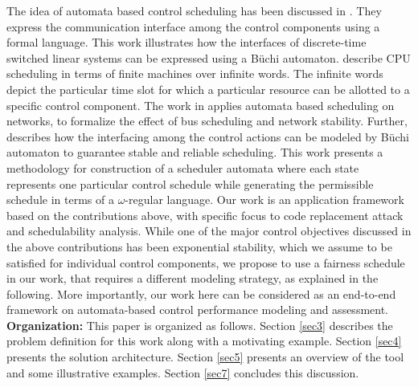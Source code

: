 \noindent
The idea of automata based control scheduling has been discussed in \cite{WeissA07}. They express
the communication interface among the control components using a formal language. This work illustrates how the interfaces of discrete-time switched linear systems
can be expressed using a B\"{u}chi automaton. \cite{AlurW08}  describe CPU scheduling
in terms of finite machines over infinite words. The infinite words depict the particular time 
slot for which a particular resource can be allotted to a specific control component. The work in \cite{WeissFAA09} applies automata based scheduling on networks, to formalize the effect of bus scheduling and network stability. Further, \cite{GhoshMDHD16} describes how the interfacing among 
the control actions can be modeled by B\"{u}chi automaton to guarantee stable and reliable
scheduling. This work presents a methodology for construction of a scheduler automata 
where each state represents one particular control schedule while generating the permissible 
schedule in terms of a $\omega$-regular language. Our work is an application framework based on the contributions above, with specific focus to code replacement attack and schedulability analysis. While one of the major control objectives discussed in the above contributions has been exponential stability, which we assume to be satisfied for individual control components, we propose to use a fairness schedule in our work, that requires a different modeling strategy, as explained in the following. More importantly, our work here can be considered as an end-to-end framework on automata-based control performance modeling and assessment. \\

\noindent
{\bf Organization:} This paper is organized as follows. Section \ref{sec3} describes the problem definition for this work along with a motivating example. Section \ref{sec4} presents the solution architecture. Section \ref{sec5} presents an overview of the tool and some illustrative examples. Section \ref{sec7} concludes this discussion.
